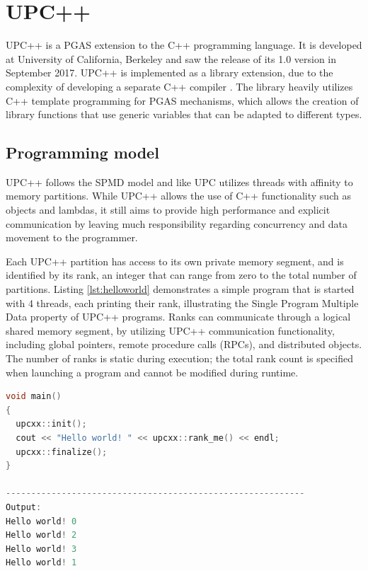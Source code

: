 \documentclass{uit-report}
\begin{document}
\section{UPC++}
UPC++ is a PGAS extension to the C++ programming language. It is developed at University of California, Berkeley and saw the release of its 1.0 version in September 2017. UPC++ is implemented as a library extension, due to the complexity of developing a separate C++ compiler \cite{zheng_kamil_driscoll_shan_yelick_2014}. The library heavily utilizes C++ template programming \cite{web_cpp_template} for PGAS mechanisms, which allows the creation of library functions that use generic variables that can be adapted to different types. 

\subsection{Programming model}
UPC++ follows the SPMD model and like UPC utilizes threads with affinity to memory partitions. While UPC++ allows the use of C++ functionality such as objects and lambdas, it still aims to provide high performance and explicit communication by leaving much responsibility regarding concurrency and data movement to the programmer.

Each UPC++ partition has access to its own private memory segment, and is identified by its rank, an integer that can range from zero to the total number of partitions. Listing \ref{lst:helloworld} demonstrates a simple program that is started with 4 threads, each printing their rank, illustrating the Single Program Multiple Data property of UPC++ programs. Ranks can communicate through a logical shared memory segment, by utilizing UPC++ communication functionality, including global pointers, remote procedure calls (RPCs), and distributed objects. The number of ranks is static during execution; the total rank count is specified when launching a program and cannot be modified during runtime.


\begin{lstlisting}[label={lst:helloworld}, float, caption="Hello World"-program in UPC++ and its output, frame=tlrb, captionpos=b, language=c++, showstringspaces=false]
void main()
{
  upcxx::init();
  cout << "Hello world! " << upcxx::rank_me() << endl;
  upcxx::finalize();
}

-----------------------------------------------------------
Output:
Hello world! 0
Hello world! 2
Hello world! 3
Hello world! 1
\end{lstlisting}
\end{document}
